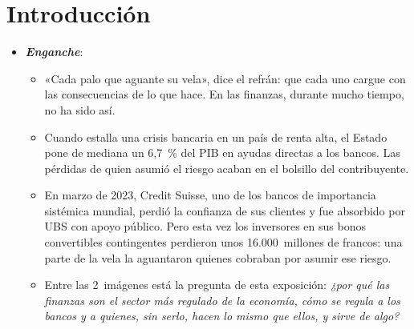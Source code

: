 \documentclass[11pt]{article}
\begin{document}
\tceetitulo

\section*{Introducción}

\begin{itemize}
\item \textbf{\emph{Enganche}}:
  \begin{itemize}
  \item «Cada palo que aguante su vela», dice el refrán: que cada uno cargue con las consecuencias de lo que hace. En las finanzas, durante mucho tiempo, no ha sido así.
  \item Cuando estalla una crisis bancaria en un país de renta alta, el Estado pone de mediana un 6,7~\% del PIB en ayudas directas a los bancos\nocite{LaevenValencia2026}. Las pérdidas de quien asumió el riesgo acaban en el bolsillo del contribuyente.
  \item En marzo de 2023, Credit Suisse, uno de los bancos de importancia sistémica mundial, perdió la confianza de sus clientes y fue absorbido por UBS con apoyo público. Pero esta vez los inversores en sus bonos convertibles contingentes perdieron unos 16.000~millones de francos\nocite{FINMA2023CSUBS}: una parte de la vela la aguantaron quienes cobraban por asumir ese riesgo.
  \item Entre las 2~imágenes está la pregunta de esta exposición: \emph{¿por qué las finanzas son el sector más regulado de la economía, cómo se regula a los bancos y a quienes, sin serlo, hacen lo mismo que ellos, y sirve de algo?}
  \end{itemize}


\end{itemize}
\end{document}
